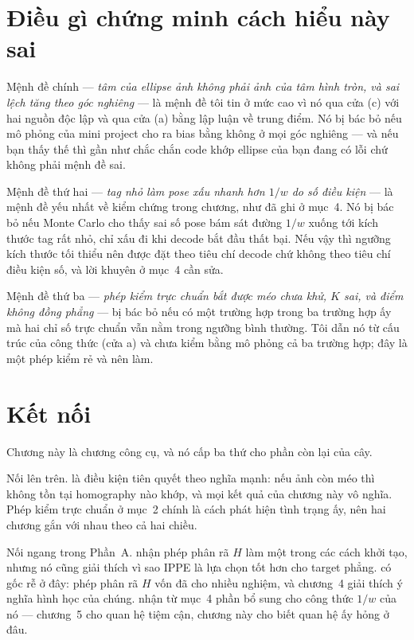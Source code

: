 \documentclass[../../marker.tex]{subfiles}
\begin{document}
\section{Điều gì chứng minh cách hiểu này sai}

Mệnh đề chính --- \emph{tâm của ellipse ảnh không phải ảnh của tâm hình tròn, và sai lệch tăng theo góc nghiêng} --- là mệnh đề tôi tin ở mức cao vì nó qua cửa (c) với hai nguồn độc lập \cite{heikkila2000geometric,mallon2007bias} và qua cửa (a) bằng lập luận về trung điểm. Nó bị bác bỏ nếu mô phỏng của mini project cho ra bias bằng không ở mọi góc nghiêng --- và nếu bạn thấy thế thì gần như chắc chắn code khớp ellipse của bạn đang có lỗi chứ không phải mệnh đề sai.

Mệnh đề thứ hai --- \emph{tag nhỏ làm pose xấu nhanh hơn \(1/w\) do số điều kiện} --- là mệnh đề yếu nhất về kiểm chứng trong chương, như đã ghi ở mục~4. Nó bị bác bỏ nếu Monte Carlo cho thấy sai số pose bám sát đường \(1/w\) xuống tới kích thước tag rất nhỏ, chỉ xấu đi khi decode bắt đầu thất bại. Nếu vậy thì ngưỡng kích thước tối thiểu nên được đặt theo tiêu chí decode chứ không theo tiêu chí điều kiện số, và lời khuyên ở mục~4 cần sửa.

Mệnh đề thứ ba --- \emph{phép kiểm trực chuẩn bắt được méo chưa khử, \(K\) sai, và điểm không đồng phẳng} --- bị bác bỏ nếu có một trường hợp trong ba trường hợp ấy mà hai chỉ số trực chuẩn vẫn nằm trong ngưỡng bình thường. Tôi dẫn nó từ cấu trúc của công thức (cửa a) và chưa kiểm bằng mô phỏng cả ba trường hợp; đây là một phép kiểm rẻ và nên làm.

\section{Kết nối}

Chương này là chương công cụ, và nó cấp ba thứ cho phần còn lại của cây.

Nối lên trên.  là điều kiện tiên quyết theo nghĩa mạnh: nếu ảnh còn méo thì không tồn tại homography nào khớp, và mọi kết quả của chương này vô nghĩa. Phép kiểm trực chuẩn ở mục~2 chính là cách phát hiện tình trạng ấy, nên hai chương gắn với nhau theo cả hai chiều.

Nối ngang trong Phần~A.  nhận phép phân rã \(H\) làm một trong các cách khởi tạo, nhưng nó cũng giải thích vì sao IPPE là lựa chọn tốt hơn cho target phẳng.  có gốc rễ ở đây: phép phân rã \(H\) vốn đã cho nhiều nghiệm, và chương~4 giải thích ý nghĩa hình học của chúng.  nhận từ mục~4 phần bổ sung cho công thức \(1/w\) của nó --- chương~5 cho quan hệ tiệm cận, chương này cho biết quan hệ ấy hỏng ở đâu.
\end{document}
